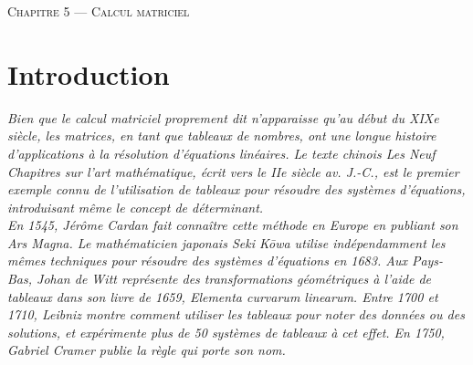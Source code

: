 \documentclass[a4paper]{article}
\begin{document}
\begin{center}
  {\scshape\LARGE Chapitre 5 --- Calcul matriciel\par}
  \vspace{2cm}
\end{center}



\section{Introduction}

\emph{Bien que le calcul matriciel proprement dit n'apparaisse qu'au début du XIXe siècle, les matrices, en tant que tableaux de nombres, ont une longue histoire d'applications à la résolution d'équations linéaires. Le texte chinois Les Neuf Chapitres sur l'art mathématique, écrit vers le IIe siècle av. J.-C., est le premier exemple connu de l'utilisation de tableaux pour résoudre des systèmes d'équations, introduisant même le concept de déterminant. }\\

\emph{En 1545, Jérôme Cardan fait connaître cette méthode en Europe en publiant son Ars Magna. Le mathématicien japonais Seki Kōwa utilise indépendamment les mêmes techniques pour résoudre des systèmes d'équations en 1683. Aux Pays-Bas, Johan de Witt représente des transformations géométriques à l'aide de tableaux dans son livre de 1659, Elementa curvarum linearum. Entre 1700 et 1710, Leibniz montre comment utiliser les tableaux pour noter des données ou des solutions, et expérimente plus de 50 systèmes de tableaux à cet effet. En 1750, Gabriel Cramer publie la règle qui porte son nom. }\\
\end{document}

